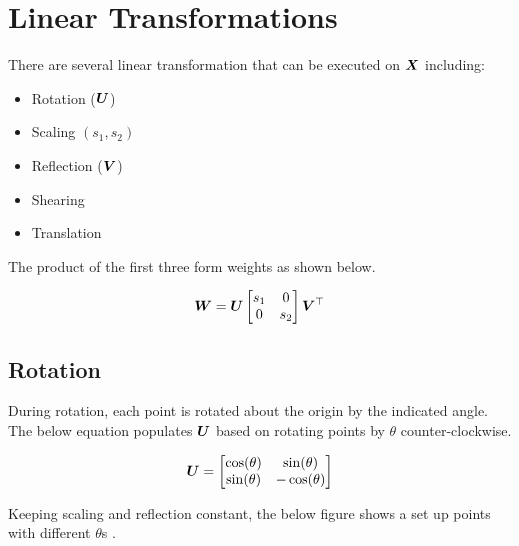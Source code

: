 \section{Linear Transformations}
There are several linear transformation that can be executed on $\bm{X}$ including:

\begin{itemize}
\item
Rotation (\(\bm{U}\))

\item
Scaling \((s_1, s_2)\)

\item
Reflection (\(\bm{V}\))
\item
Shearing
\item
Translation
\end{itemize}

The product of the first three form weights as shown below.

\[
\bm{W} = \bm{U}
\begin{bmatrix}
    s_1 & 0 \\
    0 & s_2 
\end{bmatrix}
\bm{V}^\top
\]


\subsection{Rotation}
During rotation, each point is rotated about the origin by the indicated angle. 
The below equation populates $\bm{U}$ based on rotating points by \(\theta\) counter-clockwise.

\[
\bm{U} = 
\begin{bmatrix}
    \cos(\theta) & \sin(\theta)\\
    \sin(\theta) & -\cos(\theta)
\end{bmatrix}
\]

Keeping scaling and reflection constant, the below figure shows a set up points with different  \(\theta\)s .

